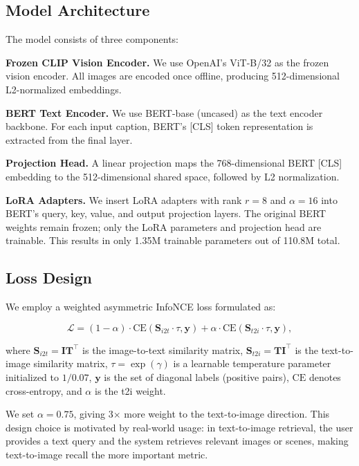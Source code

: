\documentclass[10pt,leqno]{amsart}
\begin{document}
\subsection{Model Architecture}

The model consists of three components:

\textbf{Frozen CLIP Vision Encoder.} We use OpenAI's ViT-B/32 as the frozen vision encoder. All images are encoded once offline, producing 512-dimensional L2-normalized embeddings.

\textbf{BERT Text Encoder.} We use BERT-base (uncased) as the text encoder backbone. For each input caption, BERT's [CLS] token representation is extracted from the final layer.

\textbf{Projection Head.} A linear projection maps the 768-dimensional BERT [CLS] embedding to the 512-dimensional shared space, followed by L2 normalization.

\textbf{LoRA Adapters.} We insert LoRA \citep{hu2022lora} adapters with rank $r=8$ and $\alpha=16$ into BERT's query, key, value, and output projection layers. The original BERT weights remain frozen; only the LoRA parameters and projection head are trainable. This results in only 1.35M trainable parameters out of 110.8M total.

\subsection{Loss Design}

We employ a weighted asymmetric InfoNCE loss \citep{oord2018representation} formulated as:

\begin{equation}
\mathcal{L} = (1 - \alpha) \cdot \text{CE}(\mathbf{S}_{i2t} \cdot \tau, \mathbf{y}) + \alpha \cdot \text{CE}(\mathbf{S}_{t2i} \cdot \tau, \mathbf{y}),
\label{eq:asymmetric_loss}
\end{equation}

where $\mathbf{S}_{i2t} = \mathbf{I} \mathbf{T}^{\top}$ is the image-to-text similarity matrix, $\mathbf{S}_{t2i} = \mathbf{T} \mathbf{I}^{\top}$ is the text-to-image similarity matrix, $\tau = \exp(\gamma)$ is a learnable temperature parameter initialized to $1/0.07$, $\mathbf{y}$ is the set of diagonal labels (positive pairs), $\text{CE}$ denotes cross-entropy, and $\alpha$ is the t2i weight.

We set $\alpha = 0.75$, giving 3$\times$ more weight to the text-to-image direction. This design choice is motivated by real-world usage: in text-to-image retrieval, the user provides a text query and the system retrieves relevant images or scenes, making text-to-image recall the more important metric.
\end{document}
